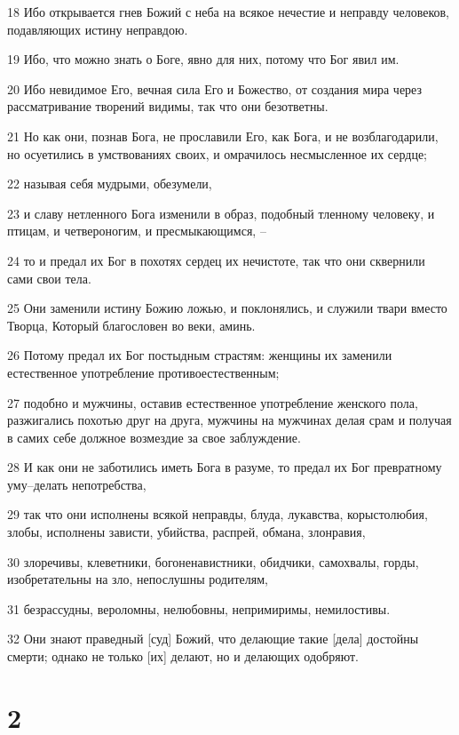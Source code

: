 \par 18 Ибо открывается гнев Божий с неба на всякое нечестие и неправду человеков, подавляющих истину неправдою.
\par 19 Ибо, что можно знать о Боге, явно для них, потому что Бог явил им.
\par 20 Ибо невидимое Его, вечная сила Его и Божество, от создания мира через рассматривание творений видимы, так что они безответны.
\par 21 Но как они, познав Бога, не прославили Его, как Бога, и не возблагодарили, но осуетились в умствованиях своих, и омрачилось несмысленное их сердце;
\par 22 называя себя мудрыми, обезумели,
\par 23 и славу нетленного Бога изменили в образ, подобный тленному человеку, и птицам, и четвероногим, и пресмыкающимся, --
\par 24 то и предал их Бог в похотях сердец их нечистоте, так что они сквернили сами свои тела.
\par 25 Они заменили истину Божию ложью, и поклонялись, и служили твари вместо Творца, Который благословен во веки, аминь.
\par 26 Потому предал их Бог постыдным страстям: женщины их заменили естественное употребление противоестественным;
\par 27 подобно и мужчины, оставив естественное употребление женского пола, разжигались похотью друг на друга, мужчины на мужчинах делая срам и получая в самих себе должное возмездие за свое заблуждение.
\par 28 И как они не заботились иметь Бога в разуме, то предал их Бог превратному уму--делать непотребства,
\par 29 так что они исполнены всякой неправды, блуда, лукавства, корыстолюбия, злобы, исполнены зависти, убийства, распрей, обмана, злонравия,
\par 30 злоречивы, клеветники, богоненавистники, обидчики, самохвалы, горды, изобретательны на зло, непослушны родителям,
\par 31 безрассудны, вероломны, нелюбовны, непримиримы, немилостивы.
\par 32 Они знают праведный [суд] Божий, что делающие такие [дела] достойны смерти; однако не только [их] делают, но и делающих одобряют.

\chapter{2}

